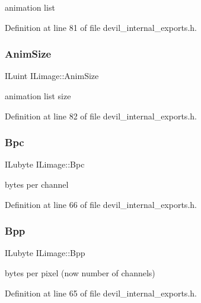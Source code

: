 animation list 



Definition at line 81 of file devil\+\_\+internal\+\_\+exports.\+h.

\mbox{\label{structILimage_a70e6057f47ac13562d06c43e17f9be56}} 
\subsubsection{\texorpdfstring{Anim\+Size}{AnimSize}}
{\footnotesize\ttfamily I\+Luint I\+Limage\+::\+Anim\+Size}



animation list size 



Definition at line 82 of file devil\+\_\+internal\+\_\+exports.\+h.

\mbox{\label{structILimage_a20c53053c80d504de93c3ee17290a9ba}} 
\subsubsection{\texorpdfstring{Bpc}{Bpc}}
{\footnotesize\ttfamily I\+Lubyte I\+Limage\+::\+Bpc}



bytes per channel 



Definition at line 66 of file devil\+\_\+internal\+\_\+exports.\+h.

\mbox{\label{structILimage_a1b3ec86e5bf7087b7d46f0ed61d86eb9}} 
\subsubsection{\texorpdfstring{Bpp}{Bpp}}
{\footnotesize\ttfamily I\+Lubyte I\+Limage\+::\+Bpp}



bytes per pixel (now number of channels) 



Definition at line 65 of file devil\+\_\+internal\+\_\+exports.\+h.

\mbox{\label{structILimage_a09ee9478fab289cf2622f06db9171894}} 
